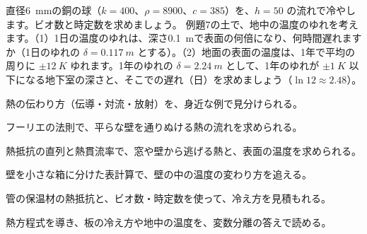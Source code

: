 \bkproblem 直径\qty{6}{mm}の銅の球（$k=400$、$\rho=8900$、$c=385$）を、$h=50$ の流れで冷やします。ビオ数と時定数を求めましょう。
\bkproblem 例題7の土で、地中の温度のゆれを考えます。（1）1日の温度のゆれは、深さ\qty{0.1}{m}で表面の何倍になり、何時間遅れますか（1日のゆれの $\delta=\qty{0.117}{m}$ とする）。（2）地面の表面の温度は、1年で平均の周りに $\pm\qty{12}{K}$ ゆれます。1年のゆれの $\delta=\qty{2.24}{m}$ として、1年のゆれが $\pm\qty{1}{K}$ 以下になる地下室の深さと、そこでの遅れ（日）を求めましょう（$\ln12\approx2.48$）。

\begin{furikaeri}
\begin{checklist}
\item 熱の伝わり方（伝導・対流・放射）を、身近な例で見分けられる。
\item フーリエの法則で、平らな壁を通りぬける熱の流れを求められる。
\item 熱抵抗の直列と熱貫流率で、窓や壁から逃げる熱と、表面の温度を求められる。
\item 壁を小さな箱に分けた表計算で、壁の中の温度の変わり方を追える。
\item 管の保温材の熱抵抗と、ビオ数・時定数を使って、冷え方を見積もれる。
\item 熱方程式を導き、板の冷え方や地中の温度を、変数分離の答えで読める。
\end{checklist}
\end{furikaeri}
